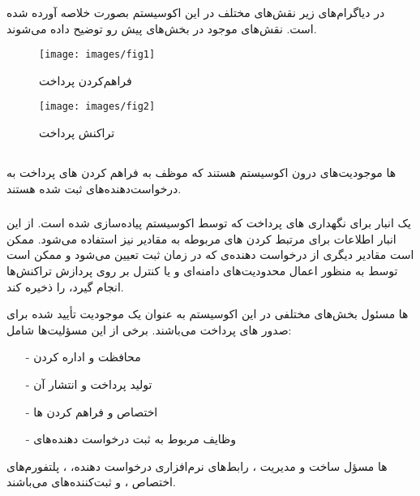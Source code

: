 \documentclass[oneside]{report}
\begin{document}
در دیاگرام‌های زیر نقش‌های مختلف در این اکوسیستم  بصورت خلاصه آورده شده است. نقش‌های موجود در بخش‌های پیش رو توضیح داده می‌شوند.

\begin{figure}
	\centering
	\texttt{[image: images/fig1]}
	\caption{فراهم‌کردن{\footnotesize  {}} پرداخت }
	\label{fig:fig1}
\end{figure}

\begin{figure}
	\centering
	\texttt{[image: images/fig2]}
	\caption{تراکنش {\footnotesize  {}} پرداخت}
	\label{fig:fig2}
\end{figure}
\newpage
\subsection{{\small {}}}
		{\normalsize  {}}ها 
		موجودیت‌های درون اکوسیستم
		{\normalsize  {}}
		هستند که موظف به فراهم کردن 
		{\normalsize  {}}های
		پرداخت به درخواست‌دهنده‌های 
		{\normalsize  {}}
		ثبت شده هستند. 
 
 \subsubsection{{\normalsize {}}}
			یک انبار برای نگهداری 
			{\normalsize {}}های
			پرداخت که توسط اکوسیستم 
			{\normalsize {}}
			پیاده‌سازی شده است. از این انبار اطلاعات برای مرتبط کردن 
			{\normalsize {}}‌های 
			مربوطه به مقادیر 
			{\normalsize {}}
			نیز استفاده می‌شود. 
			{\normalsize {}}
			ممکن است مقادیر دیگری از درخواست دهنده‌ی 
			{\normalsize {}}
			که در زمان ثبت تعیین می‌شود و ممکن است توسط 
			{\normalsize {}}
			به منظور اعمال محدودیت‌های دامنه‌ای و یا کنترل بر روی پردازش تراکنش‌ها انجام گیرد، را ذخیره کند.
					
	{\normalsize {}}ها 
	مسئول بخش‌‌های مختلفی در این اکوسیستم به عنوان  یک موجودیت تأیید شده برای صدور 
	{\normalsize {}}های 
	پرداخت می‌باشند. برخی از این مسؤلیت‌ها شامل‌:
	\begin{itemize}
		\item[-]محافظت و اداره کردن 
				{\normalsize {}}	
		\item[-]تولید 
					{\normalsize {}}
					پرداخت و انتشار آن
		\item[-] اختصاص و فراهم کردن 
					{\normalsize {}}ها
		\item[-]وظایف مربوط به ثبت درخواست دهنده‌های 
					{\normalsize {}}
	\end{itemize}
								{\normalsize {}}ها 
								مسؤل ساخت و مدیریت ، رابط‌های نرم‌افزاری درخواست دهنده، 
											{\normalsize {}}
											، پلتفورم‌های اختصاص 
														{\normalsize {}}
														، و ثبت‌کننده‌های 
																	{\normalsize {}}
																	می‌باشند. 
\end{document}
